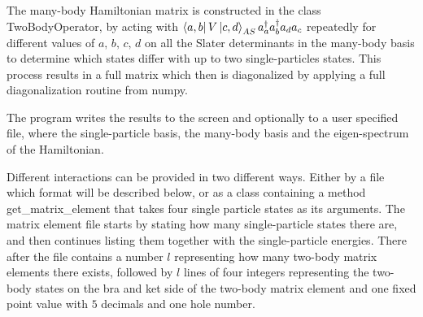 The many-body Hamiltonian matrix is constructed in the class TwoBodyOperator, by acting with \(\bra{a,b}V\ket{c,d}_{AS}a^\dagger_a a^\dagger_b a_d a_c\) repeatedly for different values of \(a,\,b,\,c,\,d\) on all the Slater determinants in the many-body basis to determine which states differ with up to two single-particles states. This process results in a full matrix
which then is diagonalized by applying a full diagonalization routine from numpy.%


The program writes the results to the screen and optionally to a user specified file, where the single-particle basis, the many-body basis and the eigen-spectrum of the Hamiltonian.

Different interactions can be provided in two different ways. Either by a file which format will be described below, or as a class containing a method get\_matrix\_element that takes four single particle states as its arguments.
The matrix element file starts by stating how many single-particle states there are, and then continues listing them together with the single-particle energies. There after the file contains a number \(l\) representing how many two-body matrix elements there exists, followed by \(l\) lines of four integers representing the two-body states on the bra and ket side of the two-body matrix element and one fixed point value with \(5\) decimals and one hole number.
